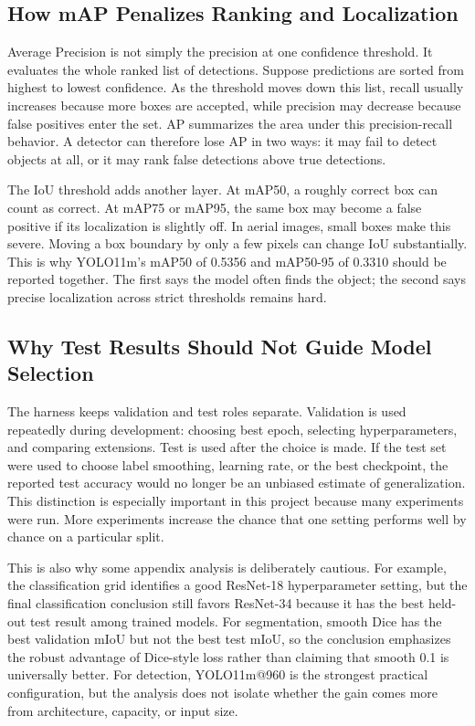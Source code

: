\documentclass[10pt,twocolumn]{article}
\begin{document}
\subsection{How mAP Penalizes Ranking and Localization}

Average Precision is not simply the precision at one confidence threshold. It evaluates the whole ranked list of detections. Suppose predictions are sorted from highest to lowest confidence. As the threshold moves down this list, recall usually increases because more boxes are accepted, while precision may decrease because false positives enter the set. AP summarizes the area under this precision-recall behavior. A detector can therefore lose AP in two ways: it may fail to detect objects at all, or it may rank false detections above true detections.

The IoU threshold adds another layer. At mAP50, a roughly correct box can count as correct. At mAP75 or mAP95, the same box may become a false positive if its localization is slightly off. In aerial images, small boxes make this severe. Moving a box boundary by only a few pixels can change IoU substantially. This is why YOLO11m's mAP50 of 0.5356 and mAP50-95 of 0.3310 should be reported together. The first says the model often finds the object; the second says precise localization across strict thresholds remains hard.

\subsection{Why Test Results Should Not Guide Model Selection}

The harness keeps validation and test roles separate. Validation is used repeatedly during development: choosing best epoch, selecting hyperparameters, and comparing extensions. Test is used after the choice is made. If the test set were used to choose label smoothing, learning rate, or the best checkpoint, the reported test accuracy would no longer be an unbiased estimate of generalization. This distinction is especially important in this project because many experiments were run. More experiments increase the chance that one setting performs well by chance on a particular split.

This is also why some appendix analysis is deliberately cautious. For example, the classification grid identifies a good ResNet-18 hyperparameter setting, but the final classification conclusion still favors ResNet-34 because it has the best held-out test result among trained models. For segmentation, smooth Dice has the best validation mIoU but not the best test mIoU, so the conclusion emphasizes the robust advantage of Dice-style loss rather than claiming that smooth 0.1 is universally better. For detection, YOLO11m@960 is the strongest practical configuration, but the analysis does not isolate whether the gain comes more from architecture, capacity, or input size.
\end{document}
